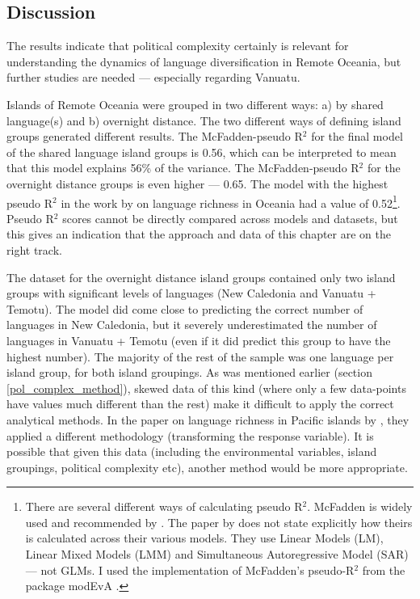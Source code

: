 \documentclass[a4paper,10pt]{article} %
\begin{document}
\subsection{Discussion}
\label{pol_chapter_discisson}
The results indicate that political complexity certainly is relevant for understanding the dynamics of language diversification in Remote Oceania, but further studies are needed --- especially regarding Vanuatu.

Islands of Remote Oceania were grouped in two different ways: a) by shared language(s) and b) overnight distance. The two different ways of defining island groups generated different results. The McFadden-pseudo R$^2$ \citep{mcfadden1974frontiers} for the final model of the shared language island groups is 0.56, which can be interpreted to mean that this model explains 56\% of the variance. The McFadden-pseudo R$^2$ for the overnight distance groups is even higher ---  0.65. The model with the highest pseudo R$^2$ in the work by \citet{gavin2012island} on language richness in Oceania had a value of 0.52\footnote{There are several different ways of calculating pseudo R$^2$. McFadden is widely used and recommended by \citet{allison2014measures}. The paper by \citet{gavin2012island} does not state explicitly how theirs is calculated across their various models. They use Linear Models (LM), Linear Mixed Models (LMM) and Simultaneous Autoregressive Model (SAR) --- not GLMs. I used the implementation of McFadden's pseudo-R$^2$ from the package modEvA \citep{barbosa2016package}.}. Pseudo R$^2$ scores cannot be directly compared across models and datasets, but this gives an indication that the approach and data of this chapter are on the right track.

The dataset for the overnight distance island groups contained only two island groups with significant levels of languages (New Caledonia and Vanuatu + Temotu). The model did come close to predicting the correct number of languages in New Caledonia, but it severely underestimated the number of languages in Vanuatu + Temotu (even if it did predict this group to have the highest number). The majority of the rest of the sample was one language per island group, for both island groupings. As was mentioned earlier (section \ref{pol_complex_method}), skewed data of this kind (where only a few data-points have values much different than the rest) make it difficult to apply the correct analytical methods. In the paper on language richness in Pacific islands by \cite{gavin2012island}, they applied a different methodology (transforming the response variable). It is possible that given this data (including the environmental variables, island groupings, political complexity etc), another method would be more appropriate.
\end{document}
